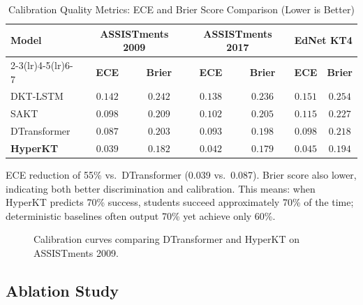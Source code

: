\documentclass[preprint,12pt]{elsarticle}
\begin{document}
\begin{table}[H]\centering
\caption{Calibration Quality Metrics: ECE and Brier Score Comparison (Lower is Better)}\label{tab:calibration}
\small
\begin{tabularx}{\linewidth}{@{\extracolsep{\fill}}lcccccc@{}}\toprule
\multirow{2}{*}{\textbf{Model}} & \multicolumn{2}{c}{\textbf{ASSISTments 2009}} & \multicolumn{2}{c}{\textbf{ASSISTments 2017}} & \multicolumn{2}{c}{\textbf{EdNet KT4}}\\\cmidrule(lr){2-3}\cmidrule(lr){4-5}\cmidrule(lr){6-7}
& \textbf{ECE} & \textbf{Brier} & \textbf{ECE} & \textbf{Brier} & \textbf{ECE} & \textbf{Brier}\\\midrule
DKT-LSTM & $0.142$ & $0.242$ & $0.138$ & $0.236$ & $0.151$ & $0.254$\\
SAKT & $0.098$ & $0.209$ & $0.102$ & $0.205$ & $0.115$ & $0.227$\\
DTransformer & $0.087$ & $0.203$ & $0.093$ & $0.198$ & $0.098$ & $0.218$\\\midrule
\textbf{HyperKT} & $\mathbf{0.039}$ & $\mathbf{0.182}$ & $\mathbf{0.042}$ & $\mathbf{0.179}$ & $\mathbf{0.045}$ & $\mathbf{0.194}$\\
\bottomrule\end{tabularx}
\end{table}

ECE reduction of 55\% vs.\ DTransformer (0.039 vs.\ 0.087). Brier score also lower, indicating both better discrimination and calibration. This means: when HyperKT predicts 70\% success, students succeed approximately 70\% of the time; deterministic baselines often output 70\% yet achieve only 60\%.

\begin{figure}[H]\centering
{}
\caption{Calibration curves comparing DTransformer and HyperKT on ASSISTments 2009.}\label{fig:calibration}
\end{figure}

\subsection{Ablation Study}
\end{document}
